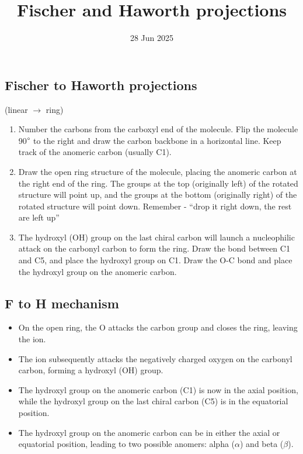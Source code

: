 \documentclass[letterpaper, 12pt]{article}
\title{Fischer and Haworth projections}
\date{28 Jun 2025}
\begin{document}
\maketitle

\subsection*{Fischer to Haworth projections}
(linear $\to$ ring)

\begin{enumerate}
\item Number the carbons from the carboxyl end of the molecule. Flip the molecule 90$\degree$ to the right and draw the carbon backbone in a horizontal line. Keep track of the anomeric carbon (usually C1).
\item Draw the open ring structure of the molecule, placing the anomeric carbon at the right end of the ring. The groups at the top (originally left) of the rotated structure will point up, and the groups at the bottom (originally right) of the rotated structure will point down. Remember - ``drop it right down, the rest are left up''
\item The hydroxyl (OH) group on the last chiral carbon will launch a nucleophilic attack on the carbonyl carbon to form the ring. Draw the bond between C1 and C5, and place the hydroxyl group on C1. Draw the O-C bond and place the hydroxyl group on the anomeric carbon.
\end{enumerate}

\subsection*{F to H mechanism}
\begin{itemize}
\item On the open ring, the O attacks the carbon group and closes the ring, leaving the  ion.
\item The  ion subsequently attacks the negatively charged oxygen on the carbonyl carbon, forming a hydroxyl (OH) group.
\item The hydroxyl group on the anomeric carbon (C1) is now in the axial position, while the hydroxyl group on the last chiral carbon (C5) is in the equatorial position.
\item The hydroxyl group on the anomeric carbon can be in either the axial or equatorial position, leading to two possible anomers: alpha ($\alpha$) and beta ($\beta$).
\end{itemize}
\end{document}
